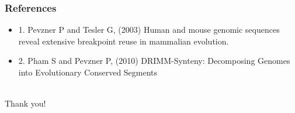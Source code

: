 \documentclass[svgnames,14pt]{beamer}
\begin{document}
\begin{frame}
\frametitle{References}
\begin{itemize}
\item 1. Pevzner P and Tesler G, (2003) Human and mouse genomic sequences reveal extensive breakpoint reuse in mammalian evolution. 
\item 2. Pham S and Pevzner P, (2010) DRIMM-Synteny: Decomposing Genomes into Evolutionary Conserved Segments
\end{itemize}
\end{frame}

\begin{center}
\hfill \huge \\
\vspace{60pt}
Thank you!
\end{center}
\end{document}

